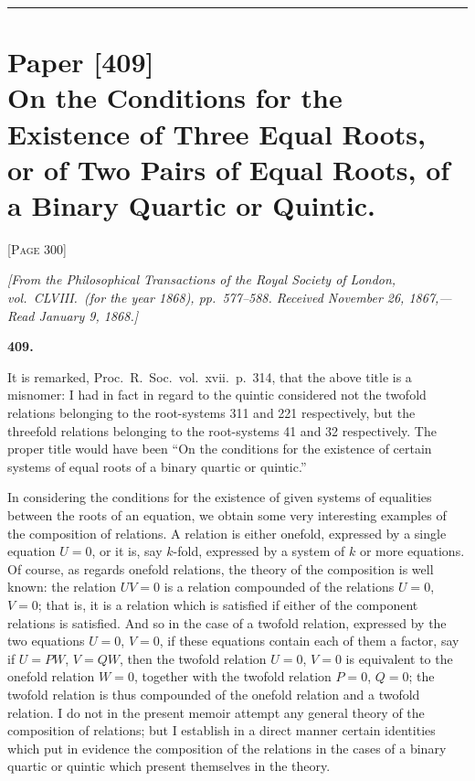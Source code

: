 \documentclass[11pt,a4paper]{article}
\theoremstyle{definition}
\begin{document}
\vspace{12pt}
\noindent\rule{\textwidth}{0.4pt}
\vspace{12pt}

\section*{Paper [409]\\
\textnormal{On the Conditions for the Existence of Three Equal Roots,\\
or of Two Pairs of Equal Roots, of a Binary Quartic or Quintic.}}

\vspace{6pt}
\noindent\textsc{[Page 300]}
\vspace{6pt}

\noindent\textit{[From the Philosophical Transactions of the Royal Society of London, vol.~CLVIII.\ (for the year 1868), pp.~577--588. Received November 26, 1867,---Read January 9, 1868.]}

\vspace{6pt}

\noindent\textbf{409.}

\vspace{4pt}

It is remarked, Proc.\ R.\ Soc.\ vol.~xvii.\ p.~314, that the above title is a misnomer: I had in fact in regard to the quintic considered not the twofold relations belonging to the root-systems 311 and 221 respectively, but the threefold relations belonging to the root-systems 41 and 32 respectively. The proper title would have been ``On the conditions for the existence of certain systems of equal roots of a binary quartic or quintic.''

In considering the conditions for the existence of given systems of equalities between the roots of an equation, we obtain some very interesting examples of the composition of relations. A relation is either onefold, expressed by a single equation $U = 0$, or it is, say $k$-fold, expressed by a system of $k$ or more equations. Of course, as regards onefold relations, the theory of the composition is well known: the relation $UV = 0$ is a relation compounded of the relations $U = 0$, $V = 0$; that is, it is a relation which is satisfied if either of the component relations is satisfied. And so in the case of a twofold relation, expressed by the two equations $U = 0$, $V = 0$, if these equations contain each of them a factor, say if $U = PW$, $V = QW$, then the twofold relation $U = 0$, $V = 0$ is equivalent to the onefold relation $W = 0$, together with the twofold relation $P = 0$, $Q = 0$; the twofold relation is thus compounded of the onefold relation and a twofold relation. I do not in the present memoir attempt any general theory of the composition of relations; but I establish in a direct manner certain identities which put in evidence the composition of the relations in the cases of a binary quartic or quintic which present themselves in the theory.
\end{document}
